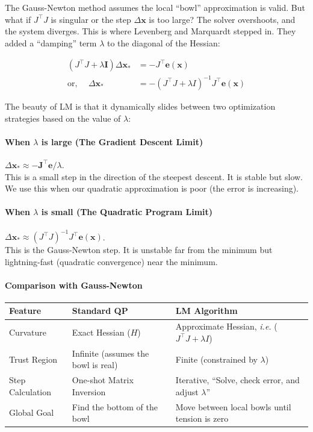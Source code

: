\documentclass[11pt]{article}
\begin{document}
The Gauss-Newton method assumes the local ``bowl''
approximation is valid.  But what if \(J^{\top}J\) is
singular or the step \(\Delta \mathbf{x}\) is too large?
The solver overshoots, and the system diverges.  This
is where Levenberg and Marquardt stepped in.  They
added a ``damping'' term \(\lambda\) to the diagonal of the
Hessian:

\begin{align*}
  (J^{\top} J + \lambda \mathbf{I}) \Delta \mathbf{x}_*
  &= -J^{\top} \mathbf{e}(\mathbf{x}) \\ \text{or,
  }\quad \Delta \mathbf{x}_*
  &= -(J^{\top} J + \lambda I) ^{-1} J^{\top}
    \mathbf{e}(\mathbf{x})
\end{align*}

The beauty of LM is that it dynamically slides between
two optimization strategies based on the value of
\(\lambda\):
\paragraph*{When \(\lambda\) is large (The Gradient Descent Limit)}
\label{sec:org5558c43}

\(\Delta \mathbf{x}_* \approx
-\mathbf{J}^{\top} \mathbf{e} / \lambda\). \\
This is a small step in the direction of the steepest
descent. It is stable but slow. We use this when our
quadratic approximation is poor (the error is
increasing).
\paragraph*{When \(\lambda\) is small (The Quadratic Program Limit)}
\label{sec:org0f4ed08}

\(\Delta \mathbf{x}_* \approx (J^{\top}J)^{-1}J^{\top}
\mathbf{e}(\mathbf{x})\). \\
This is the Gauss-Newton step. It is unstable far from
the minimum but lightning-fast (quadratic convergence)
near the minimum.
\paragraph*{Comparison with Gauss-Newton}
\label{sec:org83e072c}
\begin{center}
\begin{tabularx}{\textwidth}{lXX}
\hline
\textbf{Feature} & \textbf{Standard QP} & \textbf{LM Algorithm}\\
\hline
Curvature & Exact Hessian (\(H\)) & Approximate Hessian, \emph{i.e.} (\(J^{\top}J+\lambda I\))\\
Trust Region & Infinite (assumes the bowl is real) & Finite (constrained by \(\lambda\))\\
Step Calculation & One-shot Matrix Inversion & Iterative, ``Solve, check error, and adjust \(\lambda\)''\\
Global Goal & Find the bottom of the bowl & Move between local bowls until tension is zero\\
\end{tabularx}
\end{center}
\end{document}
